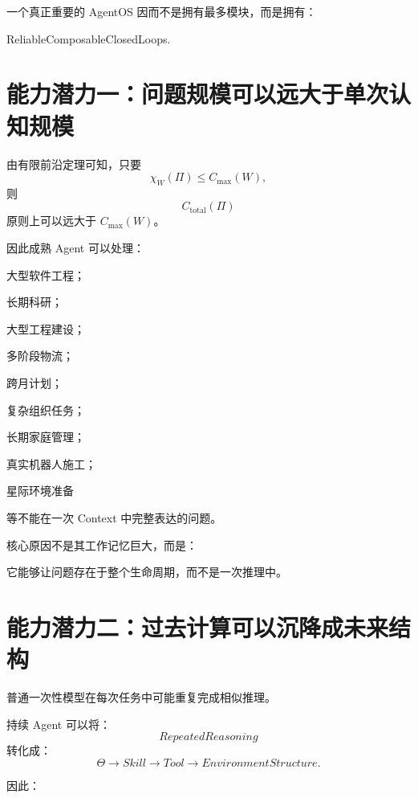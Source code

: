 一个真正重要的 AgentOS 因而不是拥有最多模块，而是拥有：

\begin{statementbox}
ReliableComposableClosedLoops.
\end{statementbox}

\section{能力潜力一：问题规模可以远大于单次认知规模}

由有限前沿定理可知，只要
\begin{equation}
\chi_W(\Pi)
\leq
C_{\max}(W),
\end{equation}
则
\begin{equation}
C_{\mathrm{total}}(\Pi)
\end{equation}
原则上可以远大于 $C_{\max}(W)$。

因此成熟 Agent 可以处理：

大型软件工程；

长期科研；

大型工程建设；

多阶段物流；

跨月计划；

复杂组织任务；

长期家庭管理；

真实机器人施工；

星际环境准备

等不能在一次 Context 中完整表达的问题。

核心原因不是其工作记忆巨大，而是：

\begin{statementbox}
它能够让问题存在于整个生命周期，而不是一次推理中。
\end{statementbox}

\section{能力潜力二：过去计算可以沉降成未来结构}

普通一次性模型在每次任务中可能重复完成相似推理。

持续 Agent 可以将：
\begin{equation}
RepeatedReasoning
\end{equation}
转化成：
\begin{equation}
\Theta
\rightarrow
Skill
\rightarrow
Tool
\rightarrow
EnvironmentStructure.
\end{equation}

因此：
\begin{statementbox}
\centering
{}
\end{statementbox}

